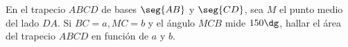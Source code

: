En el trapecio $ABCD$ de bases $\seg{AB}$ y $\seg{CD}$, sea $M$ el punto medio del lado $DA$. Si $BC=a,MC=b$ y el ángulo $MCB$ mide $150\dg$, hallar el área del trapecio $ABCD$ en función de $a$ y $b$.
